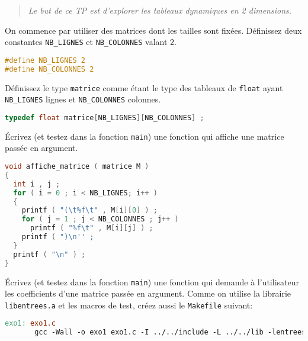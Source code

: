 
\begin{quotation}
  \sl Le but de ce TP est d'explorer les tableaux dynamiques en 2 dimensions.
\end{quotation}


On commence par utiliser des matrices dont les tailles sont
fixées. Définissez deux constantes \texttt{NB\_LIGNES} et
\texttt{NB\_COLONNES} valant \(2\).

\begin{solutioncachee}
  \begin{lstlisting}[language=C]
#define NB_LIGNES 2
#define NB_COLONNES 2
  \end{lstlisting}
\end{solutioncachee}

\question Définissez le type \texttt{matrice} comme étant le type des tableaux 
de \texttt{float} ayant \texttt{NB\_LIGNES} lignes et
\texttt{NB\_COLONNES} colonnes.

\begin{solutioncachee}
  \begin{lstlisting}[language=C]
typedef float matrice[NB_LIGNES][NB_COLONNES] ;
  \end{lstlisting}
\end{solutioncachee}

\question Écrivez (et testez dans la fonction \texttt{main}) une
fonction qui affiche une matrice passée en argument. 


\begin{solutioncachee}
  \begin{lstlisting}[language=C]
void affiche_matrice ( matrice M )
{
  int i , j ;
  for ( i = 0 ; i < NB_LIGNES; i++ )
  {
    printf ( "(\t%f\t" , M[i][0] ) ;
    for ( j = 1 ; j < NB_COLONNES ; j++ )
      printf ( "%f\t" , M[i][j] ) ;
    printf ( ")\n'' ;
  }
  printf ( "\n" ) ;
}
  \end{lstlisting}
\end{solutioncachee}

\question Écrivez (et testez dans la fonction \texttt{main}) une
fonction qui demande à l'utilisateur les coefficients d'une matrice
passée en argument. Comme on utilise la librairie
\texttt{libentrees.a} et les macros de test, créez aussi le
\texttt{Makefile} suivant:

\begin{lstlisting}[language=make]
exo1: exo1.c
       gcc -Wall -o exo1 exo1.c -I ../../include -L ../../lib -lentrees
\end{lstlisting}

